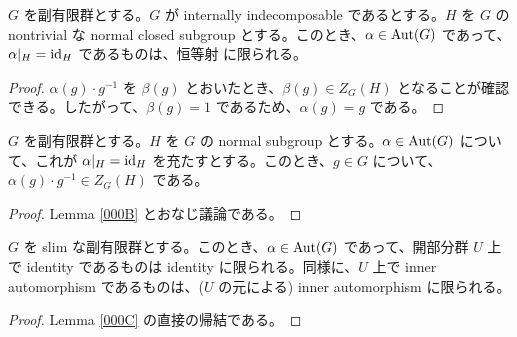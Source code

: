\begin{lem}[自己同型に関するトリック]\label{000B}
  $G$ を副有限群とする。$G$ が internally indecomposable であるとする。$H$ を $G$ の nontrivial な normal closed subgroup とする。このとき、$\alpha \in \mathrm{Aut}(G)$ であって、$\alpha|_H = \mathrm{id}_H$ であるものは、恒等射
  に限られる。
\end{lem}
\begin{proof}
  $\alpha(g) \cdot g^{-1}$ を $\beta(g)$ とおいたとき、$\beta(g) \in Z_G(H)$ となることが確認できる。したがって、$\beta(g) = 1$ であるため、$\alpha(g) = g$ である。
\end{proof}

\begin{lem}\label{000C}
  $G$ を副有限群とする。$H$ を $G$ の normal subgroup とする。$\alpha \in \mathrm{Aut}(G)$ について、これが $\alpha|_H = \mathrm{id}_H$ を充たすとする。このとき、$g \in G$ について、$\alpha(g) \cdot g^{-1} \in Z_G(H)$ である。
\end{lem}
\begin{proof}
  Lemma \ref{000B} とおなじ議論である。
\end{proof}

\begin{lem}\label{000D}
  $G$ を slim な副有限群とする。このとき、$\alpha \in \mathrm{Aut}(G)$ であって、開部分群 $U$ 上で identity であるものは identity に限られる。同様に、$U$ 上で inner automorphism であるものは、($U$ の元による) inner automorphism に限られる。
\end{lem}
\begin{proof}
  Lemma \ref{000C} の直接の帰結である。
\end{proof}

